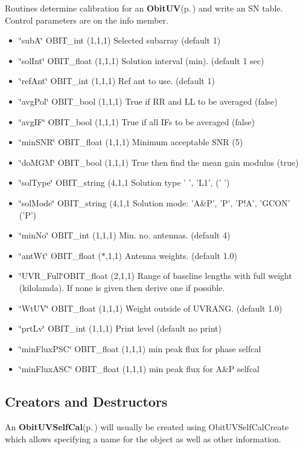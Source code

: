 Routines determine calibration for an {\bf Obit\-UV}{\rm (p.\,\pageref{structObitUV})} and write an SN table. Control parameters are on the info member. \begin{itemize}
\item \char`\"{}sub\-A\char`\"{} OBIT\_\-int (1,1,1) Selected subarray (default 1) \item \char`\"{}sol\-Int\char`\"{} OBIT\_\-float (1,1,1) Solution interval (min). (default 1 sec) \item \char`\"{}ref\-Ant\char`\"{} OBIT\_\-int (1,1,1) Ref ant to use. (default 1) \item \char`\"{}avg\-Pol\char`\"{} OBIT\_\-bool (1,1,1) True if RR and LL to be averaged (false) \item \char`\"{}avg\-IF\char`\"{} OBIT\_\-bool (1,1,1) True if all IFs to be averaged (false) \item \char`\"{}min\-SNR\char`\"{} OBIT\_\-float (1,1,1) Minimum acceptable SNR (5) \item \char`\"{}do\-MGM\char`\"{} OBIT\_\-bool (1,1,1) True then find the mean gain modulus (true) \item \char`\"{}sol\-Type\char`\"{} OBIT\_\-string (4,1,1 Solution type ' ', 'L1', (' ') \item \char`\"{}sol\-Mode\char`\"{} OBIT\_\-string (4,1,1 Solution mode: 'A\&P', 'P', 'P!A', 'GCON' ('P') \item \char`\"{}min\-No\char`\"{} OBIT\_\-int (1,1,1) Min. no. antennas. (default 4) \item \char`\"{}ant\-Wt\char`\"{} OBIT\_\-float ($\ast$,1,1) Antenna weights. (default 1.0) \item \char`\"{}UVR\_\-Full\char`\"{}OBIT\_\-float (2,1,1) Range of baseline lengths with full weight (kilolamda). If none is given then derive one if possible. \item \char`\"{}Wt\-UV\char`\"{} OBIT\_\-float (1,1,1) Weight outside of UVRANG. (default 1.0) \item \char`\"{}prt\-Lv\char`\"{} OBIT\_\-int (1,1,1) Print level (default no print) \item \char`\"{}min\-Flux\-PSC\char`\"{} OBIT\_\-float (1,1,1) min peak flux for phase selfcal \item \char`\"{}min\-Flux\-ASC\char`\"{} OBIT\_\-float (1,1,1) min peak flux for A\&P selfcal\end{itemize}
\subsection{Creators and Destructors}\label{ObitUVSelfCal_8h_ObitUVSelfCalaccess}
An {\bf Obit\-UVSelf\-Cal}{\rm (p.\,\pageref{structObitUVSelfCal})} will usually be created using Obit\-UVSelf\-Cal\-Create which allows specifying a name for the object as well as other information.

